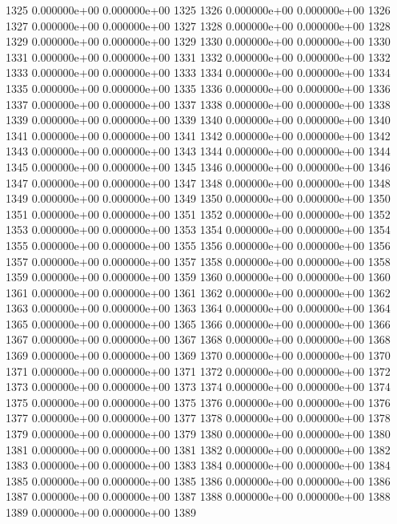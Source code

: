 \documentclass{article}
\begin{document}
\begin{Schunk}
\begin{Soutput}
1325   0.000000e+00   0.000000e+00 1325
1326   0.000000e+00   0.000000e+00 1326
1327   0.000000e+00   0.000000e+00 1327
1328   0.000000e+00   0.000000e+00 1328
1329   0.000000e+00   0.000000e+00 1329
1330   0.000000e+00   0.000000e+00 1330
1331   0.000000e+00   0.000000e+00 1331
1332   0.000000e+00   0.000000e+00 1332
1333   0.000000e+00   0.000000e+00 1333
1334   0.000000e+00   0.000000e+00 1334
1335   0.000000e+00   0.000000e+00 1335
1336   0.000000e+00   0.000000e+00 1336
1337   0.000000e+00   0.000000e+00 1337
1338   0.000000e+00   0.000000e+00 1338
1339   0.000000e+00   0.000000e+00 1339
1340   0.000000e+00   0.000000e+00 1340
1341   0.000000e+00   0.000000e+00 1341
1342   0.000000e+00   0.000000e+00 1342
1343   0.000000e+00   0.000000e+00 1343
1344   0.000000e+00   0.000000e+00 1344
1345   0.000000e+00   0.000000e+00 1345
1346   0.000000e+00   0.000000e+00 1346
1347   0.000000e+00   0.000000e+00 1347
1348   0.000000e+00   0.000000e+00 1348
1349   0.000000e+00   0.000000e+00 1349
1350   0.000000e+00   0.000000e+00 1350
1351   0.000000e+00   0.000000e+00 1351
1352   0.000000e+00   0.000000e+00 1352
1353   0.000000e+00   0.000000e+00 1353
1354   0.000000e+00   0.000000e+00 1354
1355   0.000000e+00   0.000000e+00 1355
1356   0.000000e+00   0.000000e+00 1356
1357   0.000000e+00   0.000000e+00 1357
1358   0.000000e+00   0.000000e+00 1358
1359   0.000000e+00   0.000000e+00 1359
1360   0.000000e+00   0.000000e+00 1360
1361   0.000000e+00   0.000000e+00 1361
1362   0.000000e+00   0.000000e+00 1362
1363   0.000000e+00   0.000000e+00 1363
1364   0.000000e+00   0.000000e+00 1364
1365   0.000000e+00   0.000000e+00 1365
1366   0.000000e+00   0.000000e+00 1366
1367   0.000000e+00   0.000000e+00 1367
1368   0.000000e+00   0.000000e+00 1368
1369   0.000000e+00   0.000000e+00 1369
1370   0.000000e+00   0.000000e+00 1370
1371   0.000000e+00   0.000000e+00 1371
1372   0.000000e+00   0.000000e+00 1372
1373   0.000000e+00   0.000000e+00 1373
1374   0.000000e+00   0.000000e+00 1374
1375   0.000000e+00   0.000000e+00 1375
1376   0.000000e+00   0.000000e+00 1376
1377   0.000000e+00   0.000000e+00 1377
1378   0.000000e+00   0.000000e+00 1378
1379   0.000000e+00   0.000000e+00 1379
1380   0.000000e+00   0.000000e+00 1380
1381   0.000000e+00   0.000000e+00 1381
1382   0.000000e+00   0.000000e+00 1382
1383   0.000000e+00   0.000000e+00 1383
1384   0.000000e+00   0.000000e+00 1384
1385   0.000000e+00   0.000000e+00 1385
1386   0.000000e+00   0.000000e+00 1386
1387   0.000000e+00   0.000000e+00 1387
1388   0.000000e+00   0.000000e+00 1388
1389   0.000000e+00   0.000000e+00 1389

\end{Soutput}
\end{Schunk}
\end{document}
